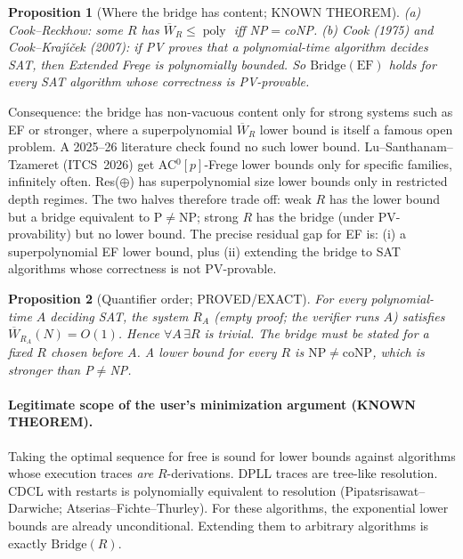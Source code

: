 \documentclass[11pt]{article}
\newtheorem{proposition}{Proposition}
\begin{document}
\begin{proposition}[Where the bridge has content; KNOWN THEOREM]
(a) Cook--Reckhow: some $R$ has $\overline W_R\le\operatorname{poly}$ iff NP$=$coNP.
(b) Cook (1975) and Cook--Kraj\'\i\v{c}ek (2007): if PV proves that a polynomial-time algorithm decides SAT, then Extended Frege is polynomially bounded.
So $\mathrm{Bridge}(\mathrm{EF})$ holds for every SAT algorithm whose correctness is PV-provable.
\end{proposition}
\noindent Consequence: the bridge has non-vacuous content only for strong systems such as EF or stronger, where a superpolynomial
$\overline W_R$ lower bound is itself a famous open problem. A 2025--26 literature check found no such lower bound.
Lu--Santhanam--Tzameret (ITCS~2026) get AC$^0[p]$-Frege lower bounds only for specific families, infinitely often.
Res($\oplus$) has superpolynomial size lower bounds only in restricted depth regimes.
The two halves therefore trade off: weak $R$ has the lower bound but a bridge equivalent to P$\neq$NP; strong $R$ has the bridge (under PV-provability) but no lower bound.
The precise residual gap for EF is: (i) a superpolynomial EF lower bound, plus (ii) extending the bridge to SAT algorithms whose correctness is not PV-provable.

\begin{proposition}[Quantifier order; PROVED/EXACT]
For every polynomial-time $A$ deciding SAT, the system $R_A$ (empty proof; the verifier runs $A$) satisfies $\overline W_{R_A}(N)=O(1)$.
Hence $\forall A\,\exists R$ is trivial. The bridge must be stated for a fixed $R$ chosen before $A$.
A lower bound for every $R$ is $\mathrm{NP}\neq\mathrm{coNP}$, which is stronger than P$\neq$NP.
\end{proposition}

\paragraph{Legitimate scope of the user's minimization argument (KNOWN THEOREM).}
Taking the optimal sequence for free is sound for lower bounds against algorithms whose execution traces \emph{are} $R$-derivations.
DPLL traces are tree-like resolution. CDCL with restarts is polynomially equivalent to resolution (Pipatsrisawat--Darwiche; Atserias--Fichte--Thurley).
For these algorithms, the exponential lower bounds are already unconditional. Extending them to arbitrary algorithms is exactly $\mathrm{Bridge}(R)$.
\end{document}
